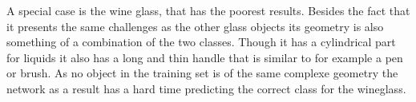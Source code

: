 A special case is the wine glass, that has the poorest results. Besides the fact that it presents the same challenges as the other glass objects its geometry is also something of a combination of the two classes. Though it has a cylindrical part for liquids it also has a long and thin handle that is similar to for example a pen or brush. As no object in the training set is of the same complexe geometry the network as a result has a hard time predicting the correct class for the wineglass.

